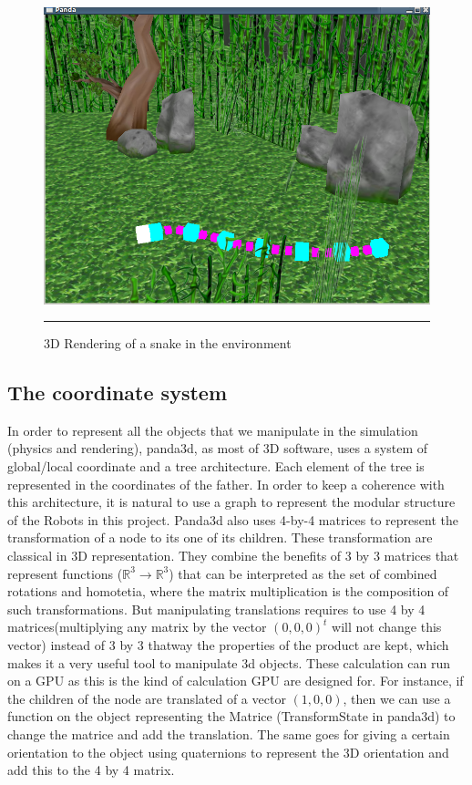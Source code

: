 \begin{figure}[htbp]
    \centering
    \includegraphics[scale=0.5]{Figures/snake.png}
    \rule{35em}{0.5pt}
    \caption[Simulated Snake in the environment]{3D Rendering of a snake in the environment}
    \label{fig:Snake}
\end{figure}



\subsection{The coordinate system}

In order to represent all the objects that we manipulate in the simulation (physics and rendering), panda3d, as most of 3D software, uses a system of global/local coordinate and a tree architecture. Each element of the tree is represented in the coordinates of the father. In order to keep a coherence with this architecture, it is natural to use a graph to represent the modular structure of the Robots in this project. Panda3d also uses 4-by-4 matrices to represent the transformation of a node to its one of its children. These transformation are classical in 3D representation. They combine the benefits of 3 by 3 matrices that represent functions ($\mathbb{R}^3 \to \mathbb{R}^3$) that can be interpreted as the set of combined rotations and homotetia, where the matrix multiplication is the composition of such transformations. But manipulating translations requires to use 4 by 4 matrices(multiplying any matrix by the vector $(0, 0, 0)^t$ will not change this vector) instead of 3 by 3 thatway the properties of the product are kept, which makes it a very useful tool to manipulate 3d objects. These calculation can run on a GPU as this is the kind of calculation GPU are designed for.
For instance, if the children of the node are translated of a vector $(1, 0, 0)$, then we can use a function on the object representing the Matrice (TransformState in panda3d) to change the matrice and add the translation. The same goes for giving a certain orientation to the object using quaternions to represent the 3D orientation and add this to the 4 by 4 matrix.

